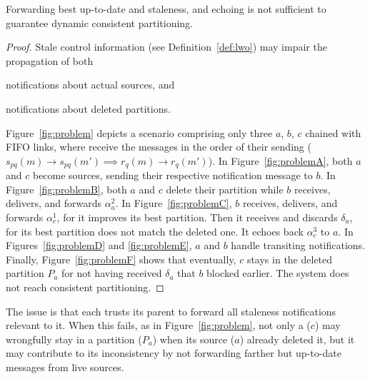 
\begin{lemma} Forwarding best up-to-date
  and staleness, and echoing is not sufficient to guarantee
  dynamic consistent partitioning.
\end{lemma}

\begin{proof}
Stale control information (see Definition~\ref{def:lwo}) may impair
the propagation of both
\begin{inparaenum}[(i)]
\item notifications about actual sources, and
\item notifications about deleted partitions.
\end{inparaenum}
Figure~\ref{fig:problem} depicts a scenario comprising only three
\processes $a$, $b$, $c$ chained with FIFO links, \ie where \processes
receive the messages in the order of their sending ($s_{pq}(m)
\rightarrow s_{pq}(m') \implies r_q(m) \rightarrow r_q(m')$). In
Figure~\ref{fig:problemA}, both $a$ and $c$ become sources, sending
their respective notification message to $b$. In
Figure~\ref{fig:problemB}, both $a$ and $c$ delete their partition
while $b$ receives, delivers, and forwards $\alpha_a^2$. In
Figure~\ref{fig:problemC}, $b$ receives, delivers, and forwards
$\alpha_c^1$, for it improves its best partition. Then it receives and
discards $\delta_a$, for its best partition does not match the deleted
one. It echoes back $\alpha_c^3$ to $a$. In Figures~\ref{fig:problemD}
and \ref{fig:problemE}, $a$ and $b$ handle transiting
notifications. Finally, Figure~\ref{fig:problemF} shows that
eventually, $c$ stays in the deleted partition $P_a$ for not having
received $\delta_a$ that $b$ blocked earlier. The system does not
reach consistent partitioning. \end{proof}

The issue is that each \process trusts its parent to forward all
staleness notifications relevant to it. When this fails, as in
Figure~\ref{fig:problem}, not only a \process ($c$) may wrongfully
stay in a partition ($P_a$) when its source ($a$) already deleted it,
but it may contribute to its inconsistency by not forwarding farther
but up-to-date messages from live sources.

